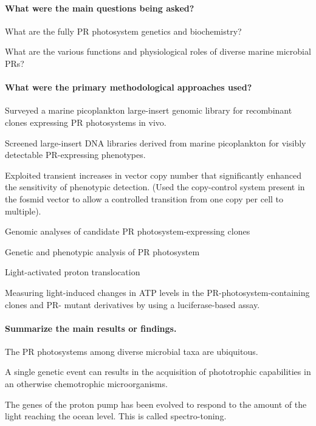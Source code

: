 \documentclass[]{article}
\let\oldparagraph\paragraph
\renewcommand{\paragraph}[1]{\oldparagraph{#1}\mbox{}}
\begin{document}
\paragraph{What were the main questions being
asked?}\label{what-were-the-main-questions-being-asked-2}

What are the fully PR photosystem genetics and biochemistry?

What are the various functions and physiological roles of diverse marine
microbial PRs?

\paragraph{What were the primary methodological approaches
used?}\label{what-were-the-primary-methodological-approaches-used-2}

Surveyed a marine picoplankton large-insert genomic library for
recombinant clones expressing PR photosystems in vivo.

Screened large-insert DNA libraries derived from marine picoplankton for
visibly detectable PR-expressing phenotypes.

Exploited transient increases in vector copy number that significantly
enhanced the sensitivity of phenotypic detection. (Used the copy-control
system present in the fosmid vector to allow a controlled transition
from one copy per cell to multiple).

Genomic analyses of candidate PR photosystem-expressing clones

Genetic and phenotypic analysis of PR photosystem

Light-activated proton translocation

Measuring light-induced changes in ATP levels in the
PR-photosystem-containing clones and PR- mutant derivatives by using a
luciferase-based assay.

\paragraph{Summarize the main results or
findings.}\label{summarize-the-main-results-or-findings.-2}

The PR photosystems among diverse microbial taxa are ubiquitous.

A single genetic event can results in the acquisition of phototrophic
capabilities in an otherwise chemotrophic microorganisms.

The genes of the proton pump has been evolved to respond to the amount
of the light reaching the ocean level. This is called spectro-toning.
\end{document}
